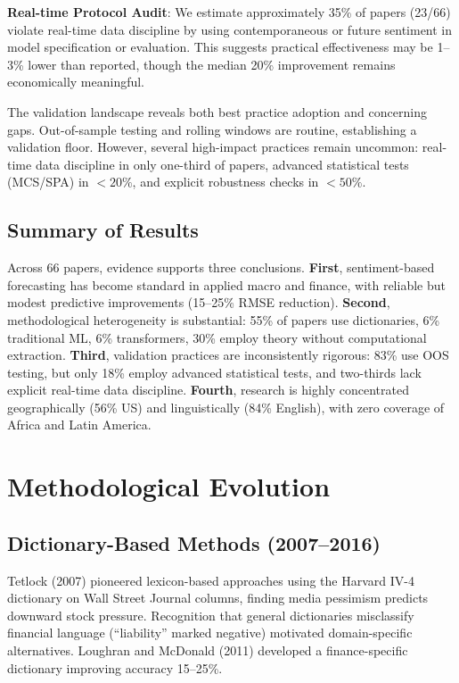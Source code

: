 \documentclass[11pt]{article}
\begin{document}
\footnotesize \textbf{Real-time Protocol Audit}: We estimate approximately 35\% of papers (23/66) violate real-time data discipline by using contemporaneous or future sentiment in model specification or evaluation. This suggests practical effectiveness may be 1--3\% lower than reported, though the median 20\% improvement remains economically meaningful.\normalsize

\normalsize The validation landscape reveals both best practice adoption and concerning gaps. Out-of-sample testing and rolling windows are routine, establishing a validation floor. However, several high-impact practices remain uncommon: real-time data discipline in only one-third of papers, advanced statistical tests (MCS/SPA) in $<20\%$, and explicit robustness checks in $<50\%$.

\subsection{Summary of Results}

Across 66 papers, evidence supports three conclusions. \textbf{First}, sentiment-based forecasting has become standard in applied macro and finance, with reliable but modest predictive improvements (15--25\% RMSE reduction). \textbf{Second}, methodological heterogeneity is substantial: 55\% of papers use dictionaries, 6\% traditional ML, 6\% transformers, 30\% employ theory without computational extraction. \textbf{Third}, validation practices are inconsistently rigorous: 83\% use OOS testing, but only 18\% employ advanced statistical tests, and two-thirds lack explicit real-time data discipline. \textbf{Fourth}, research is highly concentrated geographically (56\% US) and linguistically (84\% English), with zero coverage of Africa and Latin America.

\newpage
\section{Methodological Evolution}

\subsection{Dictionary-Based Methods (2007--2016)}

Tetlock (2007) pioneered lexicon-based approaches using the Harvard IV-4 dictionary on Wall Street Journal columns, finding media pessimism predicts downward stock pressure. Recognition that general dictionaries misclassify financial language (``liability'' marked negative) motivated domain-specific alternatives. Loughran and McDonald (2011) developed a finance-specific dictionary improving accuracy 15--25\%.
\end{document}
